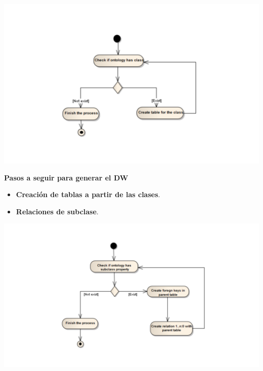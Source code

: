 \documentclass{fancyslides}
\begin{document}
\begin{frame}
\misc

\begin{center}
\includegraphics[scale=0.15]{create_tables}
\end{center}
\end{frame}


\begin{frame}
\misc
{ \textbf{\Large Pasos a seguir para generar el DW}
\newline
\newline

\begin{itemize}
  \item \textbf{Creación de tablas a partir de las clases}.
  \item \textbf{Relaciones de subclase}.
\end{itemize}

}
\end{frame}

\begin{frame}
\misc

\begin{center}
\includegraphics[scale=0.15]{is_a}
\end{center}
\end{frame}
\end{document}
